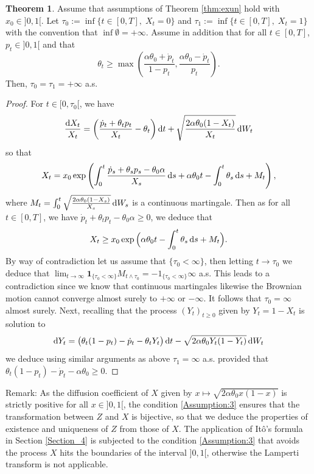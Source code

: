\documentclass[11pt]{article}
\theoremstyle{definition}
\newtheorem{Thm}[Def]{Theorem}
\begin{document}
\begin{Thm}\label{thm:mod2}
Assume that assumptions of Theorem \ref{thm:exun} hold with $x_0\in]0,1[$.
Let $\tau_0:=\inf \{t\in[0,T],\; X_t=0\}$ and  $\tau_1:=\inf \{t\in[0,T],\; X_t=1\}$ with the convention that $\inf\emptyset=+\infty$. Assume in addition that for all $t\in[0,T]$,  $p_t\in]0,1[$ and that
\begin{equation}\label{Assumption:3}
\theta_t\geq \max\left(\frac{\alpha\theta_0+\dot p_t}{1-p_t},\frac{\alpha\theta_0-\dot p_t}{p_t}\right)\tag{B}. 
\end{equation}
 Then, $\tau_0=\tau_1=+\infty$ a.s.
\end{Thm}

\begin{proof}
For $t\in[0,\tau_0[$, we have 
$$
\frac{\dif X_t}{X_t}= \left(\frac{\dot p_t +\theta_t p_t}{X_t} - \theta_t\right)\dif t  +\sqrt{\frac{2\alpha \theta_0 (1-X_t)}{X_t}} \dif W_t 
$$  
so that
$$
X_t=x_0\exp\left(\int_0^t \frac{\dot p_s +\theta_sp_s- \theta_0 \alpha}{X_s}\dif s+\alpha\theta_0 t-  \int_0^t\theta_s\dif s + M_t\right),
$$
where $M_t=\int_0^t\sqrt{\frac{2\alpha \theta_0 (1-X_s)}{X_s}} \dif W_s$ is a continuous martingale. Then as for all $t\in[0,T]$, we have $\dot p_t +\theta_tp_t- \theta_0 \alpha\ge0$, we deduce that
$$
X_t\ge x_0\exp\Big(\alpha\theta_0 t-  \int_0^t\theta_s\dif s + M_t\Big).
$$
By way of contradiction let us assume that  $\{\tau_0<\infty\}$, then letting $t\to \tau_0$ we deduce that $\lim_{t\to \infty} \mathbf 1_{\{\tau_0<\infty\}}M_{t\wedge \tau_0}=\mathbf -1_{\{\tau_0<\infty\}}\infty$ a.s. This leads to a contradiction since we know that continuous martingales likewise the Brownian motion cannot converge  almost surely to $+\infty$ or $-\infty$. It follows that $\tau_0=\infty$ almost surely. Next, recalling that  the process $(Y_t)_{t\geq 0}$  given by $Y_t=1-X_t$ is solution to 
$$
\dif Y_t= \big( \theta_t(1-p_t) -\dot p_t - \theta_tY_t  \big)\dif t  -\sqrt{2\alpha \theta_0 Y_t(1-Y_t)} \dif W_t 
$$
we deduce using similar arguments as above 
$\tau_1=\infty$ a.s. provided that $\theta_t(1-p_t) -\dot p_t -\alpha \theta_0 \ge 0$.
 \end{proof} 

Remark: As the diffusion coefficient of $X$  given by  $x \mapsto \sqrt{2 \alpha \theta_0 x(1-x)}$  is strictly positive for all $x \in  ]0,1[$, the condition \eqref{Assumption:3}  ensures that the transformation between $Z$ and $X$ is bijective, so that we deduce the properties of existence and uniqueness of $Z$ from those of $X$. The application of  It\^{o}'s formula in Section \ref{Section_4} is subjected to the condition \eqref{Assumption:3} that avoids the process $X$ hits the boundaries of the interval $ ]0,1[$, otherwise the Lamperti transform is not applicable. 



\nocite{*}
 
\printbibliography[keyword={Wind-SDE},title={References}]
\end{document}
